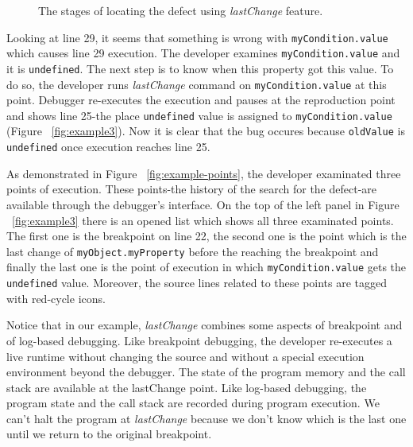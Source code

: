\documentclass[preprint]{sigplanconf}
\begin{document}
\begin{figure}[htp]

\caption{The stages of locating the defect using \textit{lastChange} feature.}
\label{fig:lastChange}
\end{figure}

Looking at line 29, it seems that something is wrong with \texttt{myCondition.value} which causes line 29 execution. The developer examines \texttt{myCondition.value} and it is \texttt{undefined}. The next step is to know when this property got this value. To do so, the developer runs \textit{lastChange} command on \texttt{myCondition.value} at this point. Debugger re-executes the execution and pauses at the reproduction point and shows line 25-the place \texttt{undefined} value is assigned to \texttt{myCondition.value} (Figure ~\ref{fig:example3}). Now it is clear that the bug occures because \texttt{oldValue} is \texttt{undefined} once execution reaches line 25.

As demonstrated in Figure ~\ref{fig:example-points}, the developer examinated three points of execution. These points-the history of the search for the defect-are available through the debugger's interface. On the top of the left panel in Figure ~\ref{fig:example3} there is an opened list which shows all three examinated points. The first one is the breakpoint on line 22, the second one is the point which is the last change of \texttt{myObject.myProperty} before the reaching the breakpoint and finally the last one is the point of execution in which \texttt{myCondition.value} gets the \texttt{undefined} value. Moreover, the source lines related to these points are tagged with red-cycle icons.

Notice that in our example, \textit{lastChange} combines some aspects of breakpoint and of log-based debugging. Like breakpoint debugging, the developer re-executes a live runtime without changing the source and without a special execution environment beyond the debugger. The state of the program memory and the call stack are available at the lastChange point. Like log-based debugging, the program state and the call stack are recorded during program execution. We can't halt the program at \textit{lastChange} because we don't know which is the last one until we return to the original breakpoint.
\end{document}
